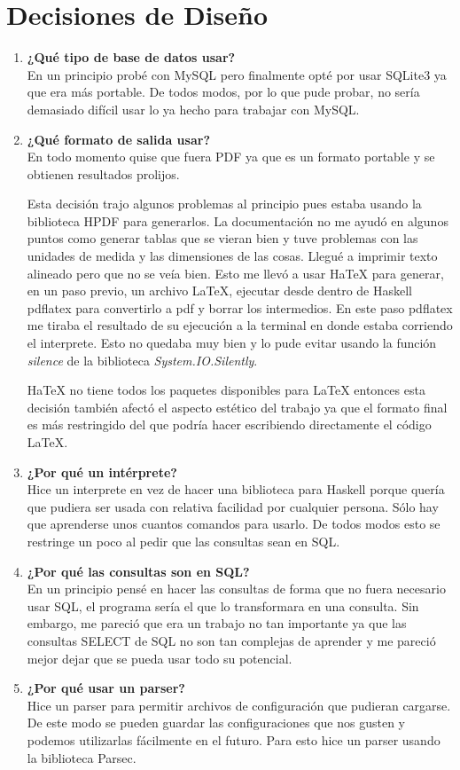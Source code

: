 \documentclass[a4paper,12pt]{article}
\begin{document}
\section{Decisiones de Diseño}

\begin{enumerate}
\item \textbf{¿Qué tipo de base de datos usar?}\\
En un principio probé con MySQL pero finalmente opté por usar SQLite3 ya que era más portable. De todos modos, por lo que pude probar, no sería demasiado difícil usar lo ya hecho para trabajar con MySQL.
\item \textbf{¿Qué formato de salida usar?}\\
En todo momento quise que fuera PDF ya que es un formato portable y se obtienen resultados prolijos. %

Esta decisión trajo algunos problemas al principio pues estaba usando la biblioteca HPDF para generarlos. La documentación no me ayudó en algunos puntos como generar tablas que se vieran bien y tuve problemas con las unidades de medida y las dimensiones de las cosas. Llegué a imprimir texto alineado pero que no se veía bien.
Esto me llevó a usar HaTeX para generar, en un paso previo, un archivo LaTeX, ejecutar desde dentro de Haskell pdflatex para convertirlo a pdf y borrar los intermedios.
En este paso pdflatex me tiraba el resultado de su ejecución a la terminal en donde estaba corriendo el interprete. Esto no quedaba muy bien y lo pude evitar usando la función \textit{silence} de la biblioteca \textit{System.IO.Silently}.

HaTeX no tiene todos los paquetes disponibles para LaTeX entonces esta decisión también afectó el aspecto estético del trabajo ya que el formato final es más restringido del que podría hacer escribiendo directamente el código LaTeX.

\item \textbf{¿Por qué un intérprete?}\\
Hice un interprete en vez de hacer una biblioteca para Haskell porque quería que pudiera ser usada con relativa facilidad por cualquier persona. Sólo hay que aprenderse unos cuantos comandos para usarlo. De todos modos esto se restringe un poco al pedir que las consultas sean en SQL.

\item \textbf{¿Por qué las consultas son en SQL?}\\
En un principio pensé en hacer las consultas de forma que no fuera necesario usar SQL, el programa sería el que lo transformara en una consulta. Sin embargo, me pareció que era un trabajo no tan importante ya que las consultas SELECT de SQL no son tan complejas de aprender y me pareció mejor dejar que se pueda usar todo su potencial.

\item \textbf{¿Por qué usar un parser?}\\
Hice un parser para permitir archivos de configuración que pudieran cargarse. De este modo se pueden guardar las configuraciones que nos gusten y podemos utilizarlas fácilmente en el futuro. Para esto hice un parser usando la biblioteca Parsec.
\end{enumerate}
\end{document}
